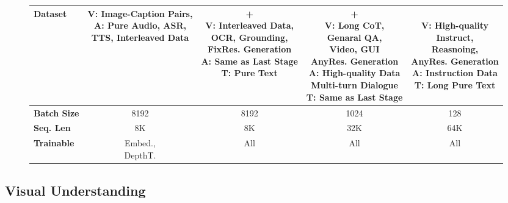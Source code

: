 \documentclass{article}
\begin{document}
\begin{figure}[htbp]
\begin{minipage}[c]{0.57\textwidth}
{\begin{tabular}{@{}l | c c c c@{}}
            \textbf{Dataset} & 
            \makecell[c]{\textbf{V:} Image-Caption Pairs, \\ \textbf{A:} Pure Audio, ASR, \\ TTS, Interleaved Data} & 
            \makecell[c]{+\\ \textbf{V:} Interleaved Data,\\ OCR, Grounding, \\ FixRes. Generation \\ \textbf{A:} Same as Last Stage\\ \textbf{T:} Pure Text} & 
            \makecell[c]{+\\ \textbf{V:} Long CoT,\\Genaral QA,\\Video, GUI\\AnyRes. Generation\\ \textbf{A:} High-quality Data \\ Multi-turn Dialogue \\ \textbf{T:} Same as Last Stage} & 
            \makecell[c]{\\ \textbf{V:} High-quality\\Instruct,\\ Reasnoing,\\AnyRes. Generation \\ 
            \textbf{A:} Instruction Data\\
            \textbf{T:} Long Pure Text} \\
            \midrule
            
            \textbf{Batch Size} & 8192 & 8192 & 1024 & 128 \\
            
            \textbf{Seq. Len} & 8K & 8K & 32K & 64K \\
            
            \textbf{Trainable} & \makecell[c]{Embed.,\\DepthT.} & All & All & All \\
            
            \bottomrule
        \end{tabular}%
        } 
    \end{minipage}
    
\end{figure}




\subsection{Visual Understanding}
\end{document}
